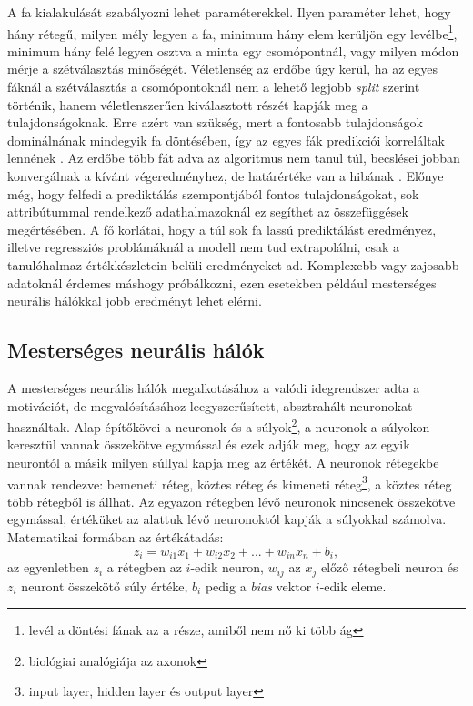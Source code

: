 \documentclass[12pt,letterpaper,oneside,openright]{book}
\begin{document}
A fa kialakulását szabályozni lehet paraméterekkel. Ilyen paraméter lehet, hogy hány rétegű, milyen mély legyen a fa, minimum hány elem kerüljön egy levélbe\footnote{levél a döntési fának az a része, amiből nem nő ki több ág}, minimum hány felé legyen osztva a minta egy csomópontnál, vagy milyen módon mérje a szétválasztás minőségét. Véletlenség az erdőbe úgy kerül, ha az egyes fáknál a szétválasztás a csomópontoknál nem a lehető legjobb \textit{split} szerint történik, hanem véletlenszerűen kiválasztott részét kapják meg a  tulajdonságoknak. Erre azért van szükség, mert a fontosabb tulajdonságok dominálnának mindegyik fa döntésében, így az egyes fák predikciói korreláltak lennének \cite{randomF}. Az erdőbe több fát adva az algoritmus nem tanul túl, becslései jobban konvergálnak a kívánt végeredményhez, de határértéke van a hibának \cite{rf2}. Előnye még, hogy felfedi a prediktálás szempontjából fontos tulajdonságokat, 
sok attribútummal rendelkező adathalmazoknál ez segíthet az összefüggések megértésében. A fő korlátai, hogy a túl sok fa lassú prediktálást eredményez, illetve regressziós problámáknál a modell nem tud extrapolálni, csak a tanulóhalmaz értékkészletein belüli eredményeket ad. Komplexebb vagy zajosabb adatoknál érdemes máshogy próbálkozni, ezen esetekben például mesterséges neurális hálókkal jobb eredményt lehet elérni.
\subsection{Mesterséges neurális hálók}
A mesterséges neurális hálók megalkotásához a valódi idegrendszer adta a motivációt, de megvalósításához leegyszerűsített, absztrahált neuronokat használtak. Alap építőkövei a neuronok és a súlyok\footnote{biológiai analógiája az axonok}, a neuronok a súlyokon keresztül vannak összekötve egymással és ezek adják meg, hogy az egyik neurontól a másik milyen súllyal kapja meg az értékét. A neuronok rétegekbe vannak rendezve: bemeneti réteg, köztes réteg és kimeneti réteg\footnote{input layer, hidden layer és output layer}, a köztes réteg több rétegből is állhat. Az egyazon rétegben lévő neuronok nincsenek összekötve egymással, értéküket az alattuk lévő neuronoktól kapják a súlyokkal számolva. Matematikai formában az értékátadás:
\begin{equation}
z_i = w_{i1}x_1 + w_{i2}x_{2} + ... + w_{in}x_n + b_i, 
\end{equation}
az egyenletben $z_i$ a rétegben az $i$-edik neuron, $w_{ij}$ az $x_j$ előző rétegbeli neuron és $z_i$ neuront összekötő súly értéke, $b_i$ pedig a \textit{bias} vektor $i$-edik eleme.  
\end{document}
